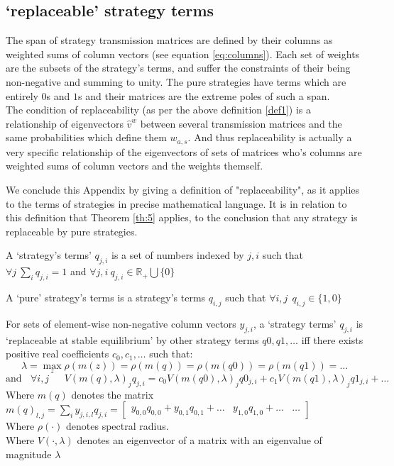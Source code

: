 \subsection{`replaceable' strategy terms}
The span of strategy transmission matrices are defined by their columns as weighted sums of column vectors (see equation \ref{eq:columns}). Each set of weights are the subsets of the strategy's terms, and suffer the constraints of their being non-negative and summing to unity.
The pure strategies have terms which are entirely $0$s and $1$s and their matrices are the extreme poles of such a span.\\
The condition of replaceability (as per the above definition \ref{def1}) is a relationship of eigenvectors $\hat{v}^{w}$ between several transmission matrices and the same probabilities which define them $w_{a,s}$.
And thus replaceability is actually a very specific relationship of the eigenvectors of sets of matrices who's columns are weighted sums of column vectors and the weights themself.

We conclude this Appendix by giving a definition of "replaceability", as it applies to the terms of strategies in precise mathematical language.
It is in relation to this definition that Theorem \ref{th:5} applies, to the conclusion that any strategy is replaceable by pure strategies.

\begin{Definition}
A `strategy's terms' $q_{j,i}$ is a set of numbers indexed by $j,i$ such that\\ $\forall j~\sum_iq_{j,i}=1$ and $\forall j,i~q_{j,i}\in\mathbb{R}_+\bigcup\{0\}$
\end{Definition}
\begin{Definition}
A `pure' strategy's terms is a strategy's terms $q_{i,j}$ such that $\forall i,j~~q_{i,j}\in\{1,0\}$
\end{Definition}
\begin{Definition}\label{def2}
For sets of element-wise non-negative column vectors $y_{j,i}$, a `strategy terms' $q_{j,i}$ is `replaceable at stable equilibrium' by other strategy terms $q0,q1,\dots$ iff there exists positive real coefficients $c_0,c_1,\dots$ such that:
$$ \lambda=\max_z\rho(m(z))=\rho(m(q))=\rho(m(q0))=\rho(m(q1))=\dots$$
$$\text{and}~~~~\forall i,j~~~~~~~ V(m(q),\lambda)_jq_{j,i} = c_0V(m(q0),\lambda)_jq0_{j,i} + c_1V(m(q1),\lambda)_jq1_{j,i} + \dots$$
Where $m(q)$ denotes the matrix $m(q)_{l,j} = \sum_iy_{j,i,l}q_{j,i} = \left[\begin{array}{c|c|c}
y_{0,0}q_{0,0}+y_{0,1}q_{0,1}+\dots & 
y_{1,0}q_{1,0}+\dots & 
\dots
\end{array}\right]$\\
Where $\rho(\cdot)$ denotes spectral radius.\\
Where $V(\cdot,\lambda)$ denotes an eigenvector of a matrix with an eigenvalue of magnitude $\lambda$
\end{Definition}
